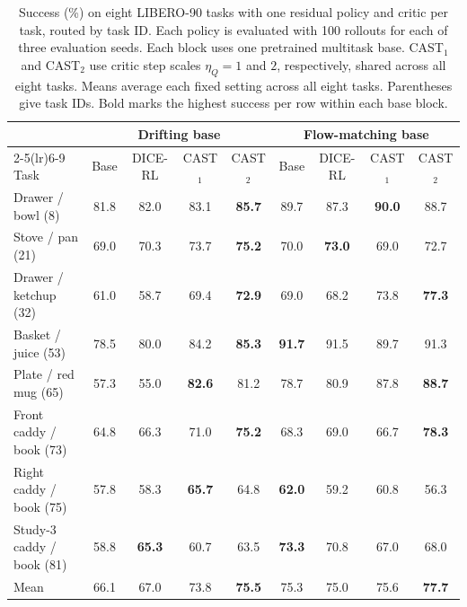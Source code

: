 \begin{table}[t]
\centering
\caption{Success (\%) on eight LIBERO-90 tasks with one residual policy and
critic per task, routed by task ID. Each policy is evaluated with 100
rollouts for each of three evaluation seeds. Each block uses one pretrained
multitask base. CAST$_1$ and CAST$_2$ use critic step scales $\eta_Q=1$ and $2$,
respectively, shared across all eight tasks. Means average each fixed setting across all eight tasks.
Parentheses give task IDs. Bold marks the highest success per row within
each base block.}
\label{tab:libero-main}
\small
\begin{tabular*}{\textwidth}{@{\extracolsep{\fill}}lcccccccc@{}}
\toprule
 & \multicolumn{4}{c}{Drifting base} & \multicolumn{4}{c}{Flow-matching base} \\
\cmidrule(lr){2-5}\cmidrule(lr){6-9}
Task & Base & DICE-RL & CAST$_1$ & CAST$_2$ & Base & DICE-RL & CAST$_1$ & CAST$_2$ \\
\midrule
Drawer / bowl (8) & 81.8 & 82.0 & 83.1 & \textbf{85.7} & 89.7 & 87.3 & \textbf{90.0} & 88.7 \\
Stove / pan (21) & 69.0 & 70.3 & 73.7 & \textbf{75.2} & 70.0 & \textbf{73.0} & 69.0 & 72.7 \\
Drawer / ketchup (32) & 61.0 & 58.7 & 69.4 & \textbf{72.9} & 69.0 & 68.2 & 73.8 & \textbf{77.3} \\
Basket / juice (53) & 78.5 & 80.0 & 84.2 & \textbf{85.3} & \textbf{91.7} & 91.5 & 89.7 & 91.3 \\
Plate / red mug (65) & 57.3 & 55.0 & \textbf{82.6} & 81.2 & 78.7 & 80.9 & 87.8 & \textbf{88.7} \\
Front caddy / book (73) & 64.8 & 66.3 & 71.0 & \textbf{75.2} & 68.3 & 69.0 & 66.7 & \textbf{78.3} \\
Right caddy / book (75) & 57.8 & 58.3 & \textbf{65.7} & 64.8 & \textbf{62.0} & 59.2 & 60.8 & 56.3 \\
Study-3 caddy / book (81) & 58.8 & \textbf{65.3} & 60.7 & 63.5 & \textbf{73.3} & 70.8 & 67.0 & 68.0 \\
\midrule
Mean & 66.1 & 67.0 & 73.8 & \textbf{75.5} & 75.3 & 75.0 & 75.6 & \textbf{77.7} \\
\bottomrule
\end{tabular*}
\end{table}
